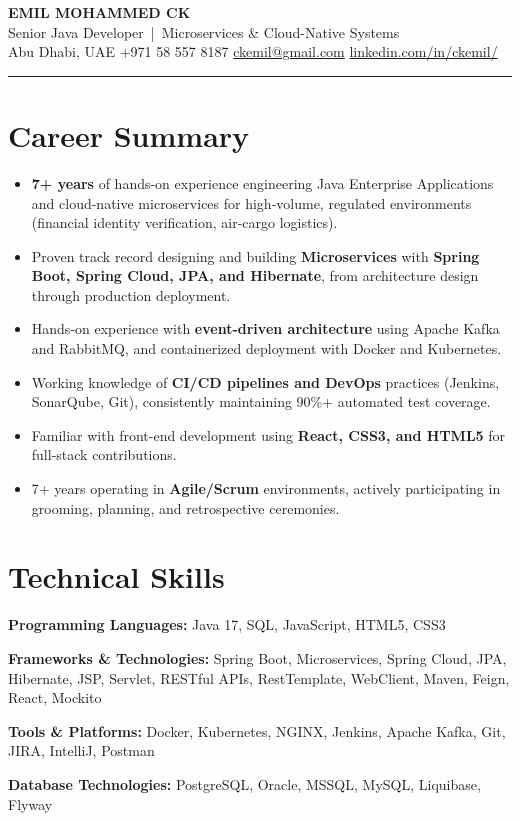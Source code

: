 \documentclass[a4paper,10pt]{article}
\newcommand{\skill}[2]{{\color{navy}\textbf{#1:}} #2\par\vspace{2pt}}
\begin{document}
\begin{center}
  {\color{navy}\bfseries\fontsize{20}{24}\selectfont EMIL MOHAMMED CK}\\[4pt]
  {\color{subtle}\large Senior Java Developer \,|\, Microservices \& Cloud-Native Systems}\\[4pt]
  {\small\color{subtle}
    Abu Dhabi, UAE \enspace\textbullet\enspace
    +971 58 557 8187 \enspace\textbullet\enspace
    \href{mailto:ckemil@gmail.com}{ckemil@gmail.com} \enspace\textbullet\enspace
    \href{https://www.linkedin.com/in/ckemil/}{linkedin.com/in/ckemil/}}
\end{center}
\vspace{-4pt}
{\color{navy}\rule{\linewidth}{1pt}}

\section{Career Summary}
\begin{itemize}
  \item \textbf{7+ years} of hands-on experience engineering Java Enterprise Applications and cloud-native microservices for high-volume, regulated environments (financial identity verification, air-cargo logistics).
  \item Proven track record designing and building \textbf{Microservices} with \textbf{Spring Boot, Spring Cloud, JPA, and Hibernate}, from architecture design through production deployment.
  \item Hands-on experience with \textbf{event-driven architecture} using Apache Kafka and RabbitMQ, and containerized deployment with Docker and Kubernetes.
  \item Working knowledge of \textbf{CI/CD pipelines and DevOps} practices (Jenkins, SonarQube, Git), consistently maintaining 90\%+ automated test coverage.
  \item Familiar with front-end development using \textbf{React, CSS3, and HTML5} for full-stack contributions.
  \item 7+ years operating in \textbf{Agile/Scrum} environments, actively participating in grooming, planning, and retrospective ceremonies.
\end{itemize}

\section{Technical Skills}
\skill{Programming Languages}{Java 17, SQL, JavaScript, HTML5, CSS3}
\skill{Frameworks \& Technologies}{Spring Boot, Microservices, Spring Cloud, JPA, Hibernate, JSP, Servlet, RESTful APIs, RestTemplate, WebClient, Maven, Feign, React, Mockito}
\skill{Tools \& Platforms}{Docker, Kubernetes, NGINX, Jenkins, Apache Kafka, Git, JIRA, IntelliJ, Postman}
\skill{Database Technologies}{PostgreSQL, Oracle, MSSQL, MySQL, Liquibase, Flyway}
\end{document}
